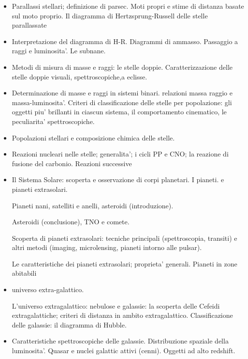 \documentclass[oneside,12pt,fleqn]{memoir}
\begin{document}
\begin{itemize}
\item Parallassi stellari; definizione di parsec. Moti propri e stime di distanza basate sul moto proprio. Il diagramma di Hertzsprung-Russell delle stelle parallassate 

\item Interpretazione del diagramma di H-R. Diagrammi di ammasso. Passaggio a raggi e luminosita'. Le subnane.

\item Metodi di misura di masse e raggi: le stelle doppie. Caratterizzazione delle stelle doppie visuali, spettroscopiche,a eclisse. 

\item Determinazione di masse e raggi in sistemi binari. relazioni massa raggio e massa-luminosita'. Criteri di classificazione delle stelle per popolazione: gli oggetti piu' brillanti in ciascun sistema, il comportamento cinematico, le peculiarita' spettroscopiche. 

\item Popolazioni stellari e composizione chimica delle stelle. 

\item Reazioni nucleari nelle stelle; generalita'; i cicli PP e CNO; la reazione di fusione del carbonio. Reazioni successive 

\item Il Sistema Solare: scoperta e osservazione di corpi planetari. I pianeti. e pianeti extrasolari.

Pianeti nani, satelliti e anelli, asteroidi (introduzione). 

Asteroidi (conclusione), TNO e comete.

Scoperta di pianeti extrasolari: tecniche principali (spettroscopia, transiti) e altri metodi (imaging, microlensing, pianeti intorno alle pulsar).

Le caratteristiche dei pianeti extrasolari; proprieta' generali. Pianeti in zone abitabili 

\item universo extra-galattico.

L'universo extragalattico: nebulose e galassie: la scoperta delle Cefeidi extragalattiche; criteri di distanza in ambito extragalattico. Classificazione delle galassie: il diagramma di Hubble.

\item Caratteristiche spettroscopiche delle galassie. Distribuzione spaziale della luminosita'. Quasar e nuclei galattic attivi (cenni). Oggetti ad alto redshift.


\end{itemize}
\end{document}
